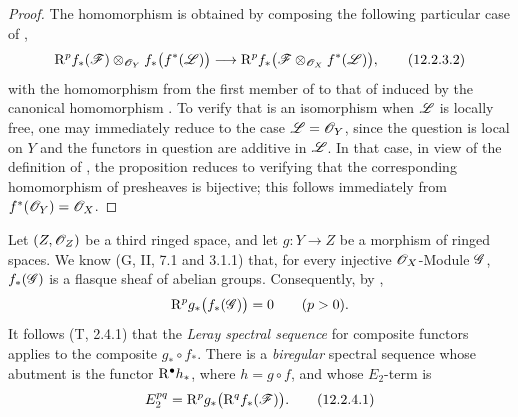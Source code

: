 \begin{proof}
The homomorphism  is obtained by composing the
following particular case of ,
\[
  \mathrm{R}^p f_*(\mathscr{F})
    \otimes_{\mathscr{O}_Y}f_*\bigl(f^*(\mathscr{L})\bigr)
  \longrightarrow
  \mathrm{R}^p f_*
    \bigl(\mathscr{F}\otimes_{\mathscr{O}_X}f^*(\mathscr{L})\bigr),
  \tag{12.2.3.2}
  \label{0.12.2.3.2}
\]
with the homomorphism from the first member of
 to that of  induced by the
canonical homomorphism .
To verify that  is an isomorphism when $\mathscr{L}$ is
locally free, one may immediately reduce to the case
$\mathscr{L}=\mathscr{O}_Y$, since the question is local on $Y$ and the
functors in question are additive in $\mathscr{L}$.
In that case, in view of the definition of , the
proposition reduces to verifying that the corresponding homomorphism
of presheaves is bijective; this follows immediately from
$f^*(\mathscr{O}_Y)=\mathscr{O}_X$.
\end{proof}

\begin{env}[12.2.4]
\label{0.12.2.4}
Let $(Z,\mathscr{O}_Z)$ be a third ringed space, and let
$g:Y\to Z$ be a morphism of ringed spaces.
We know (G, II, 7.1 and 3.1.1) that, for every injective
$\mathscr{O}_X$-Module $\mathscr{G}$, $f_*(\mathscr{G})$ is a flasque sheaf of
abelian groups.  Consequently, by ,
\[
  \mathrm{R}^p g_*\bigl(f_*(\mathscr{G})\bigr)=0
  \qquad(p>0).
\]
It follows (T, 2.4.1) that the \emph{Leray spectral sequence} for composite
functors applies to the composite $g_*\circ f_*$.  There is a
\emph{biregular} spectral sequence whose abutment is the functor
$\mathrm{R}^\bullet h_*$, where $h=g\circ f$, and whose $E_2$-term is
\[
  E_2^{pq}=\mathrm{R}^p g_*\bigl(\mathrm{R}^q f_*(\mathscr{F})\bigr).
  \tag{12.2.4.1}
  \label{0.12.2.4.1}
\]
\end{env}

